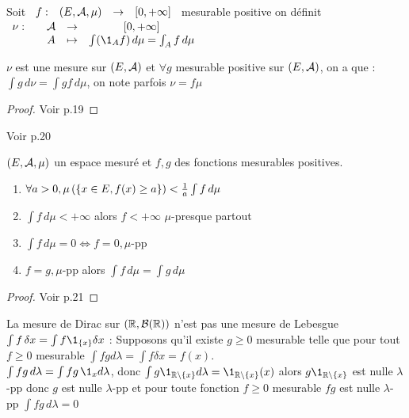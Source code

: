 \documentclass[]{report}
\begin{document}
\begin{df}
    Soit $\begin{array}{ccccc} f : & (E,\mathcal{A},\mu) & \to & [0,+\infty] \end{array}$ mesurable positive on définit $\fundfto{\nu}{\Ar}{[0,+\infty]}{A}{\int(\1_A f)\,d\mu=\int_A f\,d\mu}$
\end{df}

\begin{prop}
    $\nu$ est une mesure sur $(E,\mathcal{A})$ et $\forall g$ mesurable positive sur $(E,\mathcal{A})$, on a que : $\int g\,d\nu=\int gf\,d\mu$, on note parfois $\nu=f\mu$
\end{prop}

\begin{proof}
    Voir p.19
\end{proof}

\begin{ex}
    Voir p.20
\end{ex}

\begin{prop}
    $(E,\mathcal{A},\mu)$ un espace mesuré et $f,g$ des fonctions mesurables positives.
    \begin{enumerate}
        \item $\forall a>0,\mu\left( \left\{ x\in E, f(x)\ge a \right\} \right)<\frac{1}{a}\int f\,d\mu$
        \item $\int f\,d\mu<+\infty$ alors $f<+\infty$ $\mu$-presque partout
        \item $\int f\,d\mu=0\iff f=0,\mu$-pp
        \item $f=g,\mu$-pp alors $\int f\,d\mu=\int g\,d\mu$
    \end{enumerate}
\end{prop}

\begin{proof}
    Voir p.21
\end{proof}

\begin{re}
    La mesure de Dirac sur $(\mathbb{R},\mathcal{B}(\mathbb{R}))$ n'est pas une mesure de Lebesgue $\int f\,\delta x=\int f\1_{\{x\}}\delta x$ : Supposons qu'il existe $g\ge 0$ mesurable telle que pour tout $f\ge 0$ mesurable $\int fgd\lambda=\int f\delta x=f(x)$. \\
    $\int fg\,d\lambda=\int fg\,\1_xd\lambda$, donc $\int g\1_{\R\wt\{x\}}d\lambda=\1_{\R\wt\{x\}}(x)$ alors $g\1_{\R\wt\{x\}}$ est nulle $\lambda$-pp donc $g$ est nulle $\lambda$-pp et pour toute fonction $f\ge0$ mesurable $fg$ est nulle $\lambda$-pp $\int fg \,d\lambda=0$
\end{re}
\end{document}

